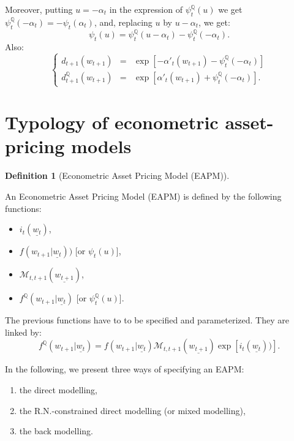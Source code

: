 \documentclass[
  12pt,
]{book}
\providecommand{\tightlist}{%
  \setlength{\itemsep}{0pt}\setlength{\parskip}{0pt}}
\theoremstyle{definition}
\newtheorem{definition}{Definition}[chapter]
\theoremstyle{definition}
\theoremstyle{definition}
\theoremstyle{definition}
\theoremstyle{remark}
\begin{document}
Moreover, putting \(u=-\alpha_t\) in the expression of
\(\psi^{\mathbb{Q}}_t(u)\) we get \(\psi^{\mathbb{Q}}_t(-\alpha_t)=-\psi_t(\alpha_t)\),
and, replacing \(u\) by \(u-\alpha_t\), we get:
\[
\boxed{\psi_t(u) = \psi^{\mathbb{Q}}_t(u-\alpha_t)-\psi^{\mathbb{Q}}_t(-\alpha_t).}
\]
Also:
\begin{equation*}
\left\{
\begin{array}{ccl}
d_{t+1}(w_{t+1}) &=& \exp[-\alpha'_t(w_{t+1})-\psi^{\mathbb{Q}}_t(-\alpha_t)] \\
d^{\mathbb{Q}}_{t+1}(w_{t+1}) &=& \exp[\alpha'_t(w_{t+1})+\psi^{\mathbb{Q}}_t(-\alpha_t)].
\end{array}
\right.
\end{equation*}

\hypertarget{PricingTypology}{%
\section{Typology of econometric asset-pricing models}\label{PricingTypology}}

\begin{definition}[Econometric Asset Pricing Model (EAPM)]
\protect\hypertarget{def:typo}{}\label{def:typo}

An Econometric Asset Pricing Model (EAPM) is defined by the following functions:

\begin{itemize}
\tightlist
\item
  \(i_{t}(\underline{w_t})\),
\item
  \(f(w_{t+1}|\underline{w_t}))\) {[}or \(\psi_t(u)\){]},
\item
  \(\mathcal{M}_{t,t+1}(\underline{w_{t+1}})\),
\item
  \(f^{\mathbb{Q}}(w_{t+1}|\underline{w_t})\) {[}or \(\psi^{\mathbb{Q}}_t(u)\){]}.
\end{itemize}

\end{definition}

The previous functions have to to be specified and parameterized. They are linked by:
\[
f^{\mathbb{Q}}(w_{t+1}|\underline{w_t}) = f(w_{t+1}|\underline{w_t}) \mathcal{M}_{t,t+1}(\underline{w_{t+1}}) \exp[i_{t}(\underline{w_t}))].
\]

In the following, we present three ways of specifying an EAPM:

\begin{enumerate}
\def\labelenumi{\arabic{enumi}.}
\tightlist
\item
  the direct modelling,
\item
  the R.N.-constrained direct modelling (or mixed modelling),
\item
  the back modelling.
\end{enumerate}
\end{document}

